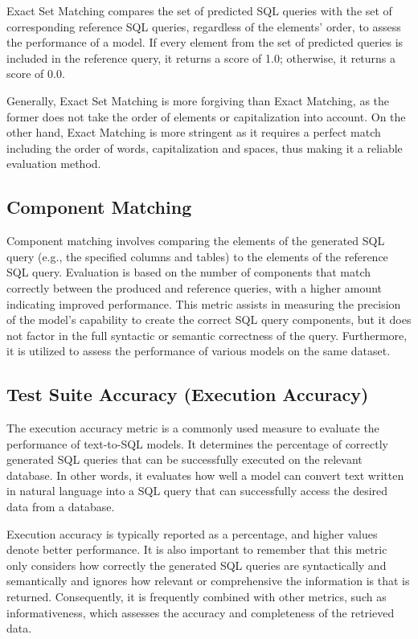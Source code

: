 Exact Set Matching compares the set of predicted SQL queries with the set of corresponding reference SQL queries, regardless of the elements' order, to assess the performance of a model. If every element from the set of predicted queries is included in the reference query, it returns a score of 1.0; otherwise, it returns a score of 0.0.

Generally, Exact Set Matching is more forgiving than Exact Matching, as the former does not take the order of elements or capitalization into account. On the other hand, Exact Matching is more stringent as it requires a perfect match including the order of words, capitalization and spaces, thus making it a reliable evaluation method.


\subsection{Component Matching}

Component matching\cite{yu_spider_2019} involves comparing the elements of the generated SQL query (e.g., the specified columns and tables) to the elements of the reference SQL query. Evaluation is based on the number of components that match correctly between the produced and reference queries, with a higher amount indicating improved performance. This metric assists in measuring the precision of the model's capability to create the correct SQL query components, but it does not factor in the full syntactic or semantic correctness of the query. Furthermore, it is utilized to assess the performance of various models on the same dataset.

\subsection{Test Suite Accuracy (Execution Accuracy)}

The execution accuracy metric\cite{yu_spider_2019} is a commonly used measure to evaluate the performance of text-to-SQL models. It determines the percentage of correctly generated SQL queries that can be successfully executed on the relevant database. In other words, it evaluates how well a model can convert text written in natural language into a SQL query that can successfully access the desired data from a database.

Execution accuracy is typically reported as a percentage, and higher values denote better performance. It is also important to remember that this metric only considers how correctly the generated SQL queries are syntactically and semantically and ignores how relevant or comprehensive the information is that is returned. Consequently, it is frequently combined with other metrics, such as informativeness, which assesses the accuracy and completeness of the retrieved data.
